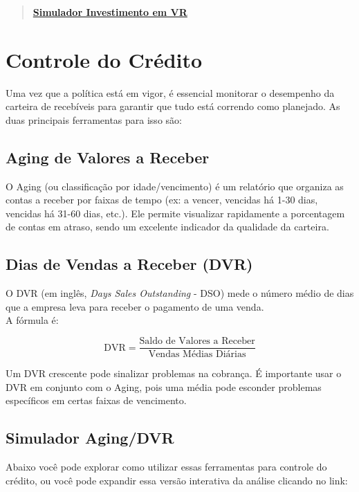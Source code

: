 \documentclass[
  a4paper,
]{book}
\begin{document}
\begin{quote}
\href{resources/04-invVR.html}{\textbf{Simulador Investimento em VR}}
\end{quote}

\section{Controle do Crédito}\label{controle-do-cruxe9dito}

Uma vez que a política está em vigor, é essencial monitorar o desempenho
da carteira de recebíveis para garantir que tudo está correndo como
planejado. As duas principais ferramentas para isso são:

\subsection{Aging de Valores a
Receber}\label{aging-de-valores-a-receber}

O Aging (ou classificação por idade/vencimento) é um relatório que
organiza as contas a receber por faixas de tempo (ex: a vencer, vencidas
há 1-30 dias, vencidas há 31-60 dias, etc.). Ele permite visualizar
rapidamente a porcentagem de contas em atraso, sendo um excelente
indicador da qualidade da carteira.

\subsection{Dias de Vendas a Receber
(DVR)}\label{dias-de-vendas-a-receber-dvr}

O DVR (em inglês, \emph{Days Sales Outstanding} - DSO) mede o número
médio de dias que a empresa leva para receber o pagamento de uma
venda.\\
A fórmula é:

\[\text{DVR} = \frac{\text{Saldo de Valores a Receber}}{\text{Vendas Médias Diárias}}\]

Um DVR crescente pode sinalizar problemas na cobrança. É importante usar
o DVR em conjunto com o Aging, pois uma média pode esconder problemas
específicos em certas faixas de vencimento.

\subsection{Simulador Aging/DVR}\label{simulador-agingdvr}

Abaixo você pode explorar como utilizar essas ferramentas para controle
do crédito, ou você pode expandir essa versão interativa da análise
clicando no link:
\end{document}
